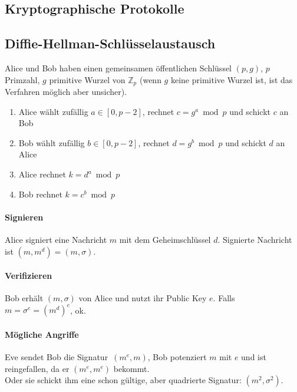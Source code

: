 \documentclass[8pt,a4paper,landscape]{article}
\begin{document}
\begin{multicols}{4}
\section{Kryptographische Protokolle}
\subsection{Diffie-Hellman-Schlüsselaustausch}
Alice und Bob haben einen gemeinsamen öffentlichen Schlüssel $(p,g)$, 
$p$ Primzahl, $g$ primitive Wurzel von $\mathbb{Z}_{p}$ (wenn $g$ keine primitive Wurzel ist, ist das Verfahren möglich aber unsicher).
\begin{enumerate}
    \item Alice wählt zufällig $a \in [0,p-2]$, rechnet 
          $c = g^a \bmod p$ und schickt $c$ an Bob
    \item Bob wählt zufällig $b \in [0,p-2]$, rechnet
          $d = g^b  \bmod p$ und schickt $d$ an Alice
    \item Alice rechnet $k = d^a \bmod p$
    \item Bob rechnet $k = c^b \bmod p$
\end{enumerate}

\paragraph{Signieren}
Alice signiert eine Nachricht $m$ mit dem Geheimschlüssel $d$. Signierte
Nachricht ist $(m, m^{d}) = (m, \sigma)$.
\paragraph{Verifizieren} Bob erhält $(m, \sigma)$ von Alice und nutzt ihr Public Key $e$.
Falls $m = \sigma^{e} = (m^{d})^{e}$, ok.

\paragraph{Mögliche Angriffe} Eve sendet Bob die \glqq Signatur\grqq\ $(m^{e}, m)$, Bob potenziert $m$ mit $e$ und ist reingefallen, da er $(m^{e}, m^{e})$ bekommt. \\
Oder sie schickt ihm eine schon gültige, aber quadrierte Signatur: $(m^2, \sigma^2)$.
\end{multicols}
\end{document}
